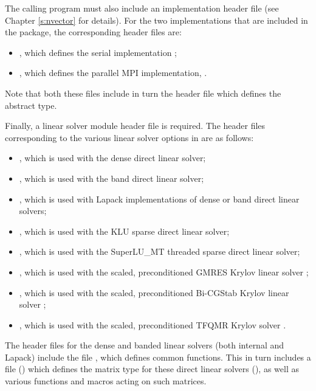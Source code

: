 The calling program must also include an {\nvector} implementation header file
(see Chapter \ref{s:nvector} for details).
For the two {\nvector} implementations that are included in the {\ida} package,
the corresponding header files are:
\begin{itemize}
\item {}, 
  which defines the serial implementation {\nvecs};
\item {}, 
  which defines the parallel MPI implementation, {\nvecp}.
\end{itemize}
Note that both these files include in turn the header file  which 
defines the abstract  type. 

Finally, a linear solver module header file is required. 
The header files corresponding to the various linear solver options in {\ida} are
as follows:
\begin{itemize}
\item {}, 
  which is used with the dense direct linear solver;

\item {}, 
  which is used with the band direct linear solver;

\item {},
  which is used with Lapack implementations of dense or band direct linear solvers;
  
\item {},
  which is used with the KLU sparse direct linear solver;
  
\item {},
  which is used with the SuperLU\_MT threaded sparse direct linear solver;
  
\item {}, 
  which is used with the scaled, preconditioned GMRES Krylov linear solver {\spgmr};

\item {}, 
  which is used with the scaled, preconditioned Bi-CGStab Krylov linear solver {\spbcg};

\item {}, 
  which is used with the scaled, preconditioned TFQMR Krylov solver {\sptfqmr}.
\end{itemize}

The header files for the dense and banded linear solvers (both
internal and Lapack) include the file , which
defines common functions.  This in turn includes a file
() which defines the matrix type for these
direct linear solvers (), as well as various functions and
macros acting on such matrices.

